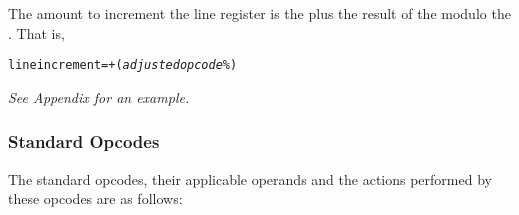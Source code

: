 The amount to increment the line register is the 
 plus
the result of the 
\textit{} modulo the 
. That
is,

\begin{alltt}
  line increment =  + (\textit{adjusted opcode} \% )
\end{alltt}

\textit{See Appendix  for an example.}


\subsubsection{Standard Opcodes}
\label{chap:standardopcodes}

The standard opcodes, their applicable operands and the
actions performed by these opcodes are as follows:

